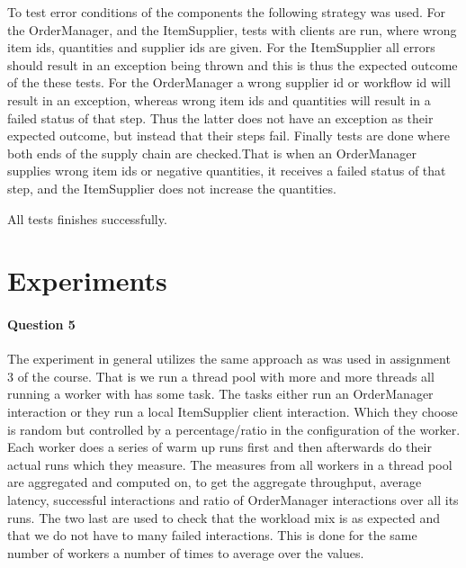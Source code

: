 \documentclass[a4paper, 11pt]{article}
\begin{document}
To test error conditions of the components the following strategy was used. For the OrderManager, and the ItemSupplier, tests with clients are run, where wrong item ids, quantities and supplier ids are given. For the ItemSupplier all errors should result in an exception being thrown and this is thus the expected outcome of the these tests. For the OrderManager a wrong supplier id or workflow id will result in an exception, whereas wrong item ids and quantities will result in a failed status of that step. Thus the latter does not have an exception as their expected outcome, but instead that their steps fail. Finally tests are done where both ends of the supply chain are checked.That is when an OrderManager supplies wrong item ids or negative quantities, it receives a failed status of that step, and the ItemSupplier does not increase the quantities.

All tests finishes successfully.



\pagebreak
\section{Experiments} %
\label{sec:experiments}

\paragraph{Question 5} %
\label{par:question_5}

The experiment in general utilizes the same approach as was used in assignment 3 of the course. That is we run a thread pool with more and more threads all running a worker with has some task. The tasks either run an OrderManager interaction or they run a local ItemSupplier client interaction. Which they choose is random but controlled by a percentage/ratio in the configuration of the worker. Each worker does a series of warm up runs first and then afterwards do their actual runs which they measure. The measures from all workers in a thread pool are aggregated and computed on, to get the aggregate throughput, average latency, successful interactions and ratio of OrderManager interactions over all its runs. The two last are used to check that the workload mix is as expected and that we do not have to many failed interactions. This is done for the same number of workers a number of times to average over the values.
\end{document}

